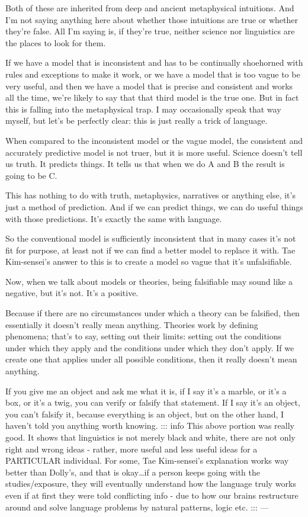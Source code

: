 Both of these are inherited from deep and ancient metaphysical intuitions. And I'm not saying anything here about whether those intuitions are true or whether they're false. All I'm saying is, if they're true, neither science nor linguistics are the places to look for them.

If we have a model that is inconsistent and has to be continually shoehorned with rules and exceptions to make it work, or we have a model that is too vague to be very useful, and then we have a model that is precise and consistent and works all the time, we're likely to say that that third model is the true one. But in fact this is falling into the metaphysical trap. I may occasionally speak that way myself, but let's be perfectly clear: this is just really a trick of language.

When compared to the inconsistent model or the vague model, the consistent and accurately predictive model is not truer, but it is more useful. Science doesn't tell us truth. It predicts things. It tells us that when we do A and B the result is going to be C.

This has nothing to do with truth, metaphysics, narratives or anything else, it's just a method of prediction. And if we can predict things, we can do useful things with those predictions. It's exactly the same with language.

So the conventional model is sufficiently inconsistent that in many cases it's not fit for purpose, at least not if we can find a better model to replace it with. Tae Kim-sensei's answer to this is to create a model so vague that it's unfalsifiable.

Now, when we talk about models or theories, being falsifiable may sound like a negative, but it's not. It's a positive.

{}

Because if there are no circumstances under which a theory can be falsified, then essentially it doesn't really mean anything. Theories work by defining phenomena; that's to say, setting out their limits: setting out the conditions under which they apply and the conditions under which they don't apply. If we create one that applies under all possible conditions, then it really doesn't mean anything.

If you give me an object and ask me what it is, if I say it's a marble, or it's a box, or it's a twig, you can verify or falsify that statement. If I say it's an object, you can't falsify it, because everything is an object, but on the other hand, I haven't told you anything worth knowing. ::: info This above portion was really good. It shows that linguistics is not merely black and white, there are not only right and wrong ideas - rather, more useful and less useful ideas for a PARTICULAR individual. For some, Tae Kim-sensei's explanation works way better than Dolly's, and that is okay\ldots{}if a person keeps going with the studies/exposure, they will eventually understand how the language truly works even if at first they were told conflicting info - due to how our brains restructure around and solve language problems by natural patterns, logic etc. ::: ---

